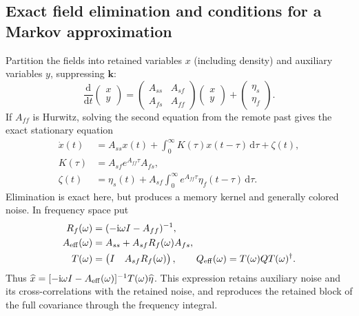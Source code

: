 \documentclass{article}
\begin{document}
\subsection{Exact field elimination and conditions for a Markov approximation}

Partition the fields into retained variables $x$ (including density) and auxiliary variables $y$, suppressing $\mathbf k$:
\begin{equation}
    \frac{\mathrm d}{\mathrm dt}\begin{pmatrix}x\\y\end{pmatrix}
    =\begin{pmatrix}A_{ss}&A_{sf}\\A_{fs}&A_{ff}\end{pmatrix}
    \begin{pmatrix}x\\y\end{pmatrix}+\begin{pmatrix}\eta_s\\\eta_f\end{pmatrix}.
\end{equation}
If $A_{ff}$ is Hurwitz, solving the second equation from the remote past gives the exact stationary equation
\begin{align}
    \dot x(t)&=A_{ss}x(t)+\int_0^\infty K(\tau)x(t-\tau)\,\mathrm d\tau
    +\zeta(t),\\
    K(\tau)&=A_{sf}e^{A_{ff}\tau}A_{fs},\\
    \zeta(t)&=\eta_s(t)+A_{sf}\int_0^\infty e^{A_{ff}\tau}\eta_f(t-\tau)\,\mathrm d\tau.
    \label{eq:gfMemory}
\end{align}
Elimination is exact here, but produces a memory kernel and generally colored noise. In frequency space put
\begin{align}
    R_f(\omega)&=(-\mathrm i\omega I-A_{ff})^{-1},\\
    A_{\rm eff}(\omega)&=A_{ss}+A_{sf}R_f(\omega)A_{fs},\\
    T(\omega)&=\begin{pmatrix}I&A_{sf}R_f(\omega)\end{pmatrix},\qquad
    Q_{\rm eff}(\omega)=T(\omega)Q T(\omega)^\dagger.
    \label{eq:gfEffectiveNoise}
\end{align}
Thus $\widehat x=[-\mathrm i\omega I-A_{\rm eff}(\omega)]^{-1}T(\omega)\widehat\eta$. This expression retains auxiliary noise and its cross-correlations with the retained noise, and reproduces the retained block of the full covariance through the frequency integral.
\end{document}
